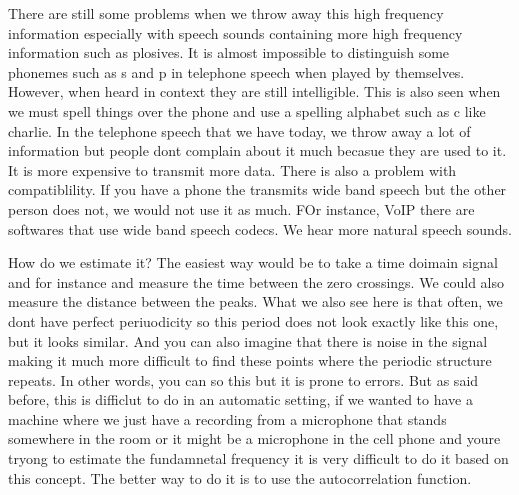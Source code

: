 There are still some problems when we throw away this high frequency information especially with speech sounds containing more high frequency information such as plosives.  It is almost impossible to distinguish some phonemes such as s and p in telephone speech when played by themselves. However, when heard in context they are still intelligible.  This is also seen when we must spell things over the phone and use a spelling alphabet such as c like charlie. In the telephone speech that we have today, we throw away a lot of information but people dont complain about it much becasue they are used to it. It is more expensive to transmit more data. There is also a problem with compatiblility.  If you have a phone the transmits wide band speech but the other person does not, we would not use it as much. FOr instance, VoIP there are softwares that use wide band speech codecs.  We hear more natural speech sounds. 

How do we estimate it? The easiest way would be to take a time doimain signal and for instance and measure the time between the zero crossings. We could also measure the distance between the peaks.  What we also see here is that often, we dont have perfect periuodicity so this period does not look exactly like this one, but it looks similar. And you can also imagine that there is noise in the signal making it much more difficult to find these points where the periodic structure repeats. In other words, you can so this but it is prone to errors. But as said before, this is difficlut to do in an automatic setting, if we wanted to have a machine where we just have a recording from a microphone that stands somewhere in the room or it might be a microphone in the cell phone and youre tryong to estimate the fundamnetal frequency it is very difficult to do it based on this concept. The better way to do it is to use the autocorrelation function.

